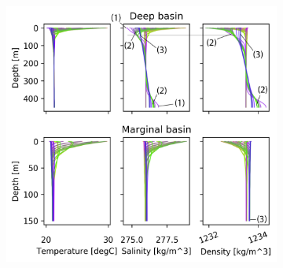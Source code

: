 \documentclass[twocolumn]{article}
\begin{document}
\begin{figure}
\begin{subfigure}[h]{0.7\textwidth}
\centering
\includegraphics[width=\textwidth,keepaspectratio]{with_adv_large_effect_40SV_altered.png}
\end{subfigure}\hfill
\begin{subfigure}[h]{0.20\textwidth}
\centering

\end{subfigure}
\end{figure}
\end{document}
